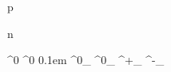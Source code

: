 

\newmathsymbol{\proton}     {p\xspace}
\newmathsymbol{\protonbar}  {\ovE{\proton}\xspace}
\newmathsymbol{\pp}         {\proton\proton\xspace}
\newmathsymbol{\ppbar}      {\proton\protonbar\xspace}

\newmathsymbol{\neutron}    {n\xspace}
\newmathsymbol{\neutronbar} {\ovE{\neutron}\xspace}

\newmathsymbol{\Lambdap}    {\mathit{\Lambda}}
\newmathsymbol{\Lambdaz}    {\Lambdap^0\xspace}
\newmathsymbol{\Lambdazbar} {\ovE{\Lambdap}^0\xspace}
\newmathsymbol{\Lambdabar}  {\kern 0.1em\ovE{\kern -0.1em\Lambdap}{}\xspace}
\newmathsymbol{\Lambdab}    {\Lambdap^0_\bquark\xspace}
\newmathsymbol{\Lambdabbar} {\Lambdabar^0_\bquark\xspace}
\newmathsymbol{\Lambdac}    {\Lambdap^+_\cquark\xspace}
\newmathsymbol{\Lambdacbar} {\Lambdabar^-_\cquark\xspace}


